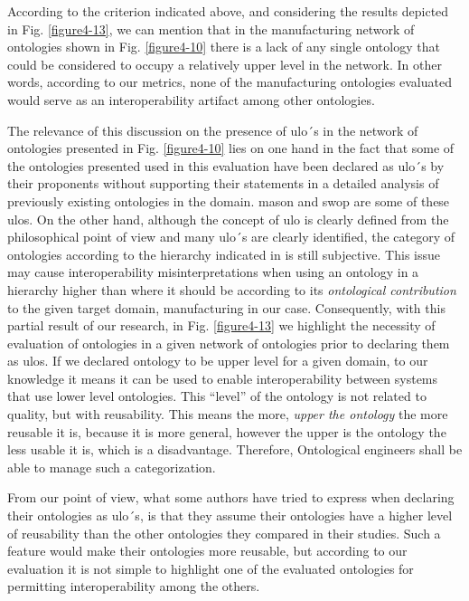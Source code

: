 According to the criterion indicated above, and considering the results depicted in Fig. \ref{figure4-13}, we can mention that in the manufacturing network of ontologies shown in Fig. \ref{figure4-10} there is a lack of any single ontology that could be considered to occupy a relatively upper level in the network. In other words, according to our metrics, none of the manufacturing ontologies evaluated would serve as an interoperability artifact among other ontologies. 

The relevance of this discussion on the presence of \gls{ulo}´s in the network of ontologies presented in Fig. \ref{figure4-10} lies on one hand in the fact that some of the ontologies presented used in this evaluation have been declared as \gls{ulo}´s by their proponents without supporting   their statements in a detailed analysis of previously existing ontologies in the domain. \gls{mason} and \gls{swop} are some of these \gls{ulo}s. On the other hand, although the concept of \gls{ulo} is clearly defined from the philosophical point of view and many \gls{ulo}´s are clearly identified, the category of ontologies according to the hierarchy indicated in \cite{gomez_perez1}  is still subjective. This issue may cause interoperability misinterpretations when using an ontology in a hierarchy higher than where it should be according to its \textit{ontological contribution} to the given target domain, manufacturing in our case. Consequently, with this partial result of our research, in Fig. \ref{figure4-13} we highlight the necessity of evaluation of ontologies in a given network of ontologies  prior to declaring them as \gls{ulo}s. If we declared ontology to be upper level for a given domain, to our knowledge it means it can be used to enable interoperability between systems that use lower level ontologies. This “level” of the ontology is not related to quality, but with reusability. This means the more, \textit{upper the ontology} the more reusable it is, because it is more general, however the upper is the ontology the less usable it is, which is a disadvantage. Therefore, Ontological engineers shall be able to manage such a categorization. 

From our point of view, what some authors have tried to express when declaring their ontologies as \gls{ulo}´s, is that they assume their ontologies have a higher level of reusability than the other ontologies they compared in their studies. Such a feature would make their ontologies more reusable, but according to our evaluation it is not simple to highlight one of the evaluated ontologies for permitting interoperability among the others. 

